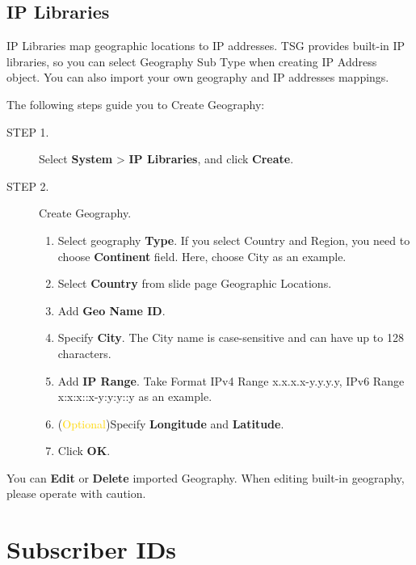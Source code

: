 \subsection*{\hypertarget{link:IP Libraries}{IP Libraries}}
\label{sec:objects:ip:library}

IP Libraries map geographic locations to IP addresses. TSG provides built-in IP libraries, so you can select Geography Sub Type when creating IP Address object. You can also import your own geography and IP addresses mappings. 


The following steps guide you to Create Geography:

\begin{description}
    \item[STEP 1.]	Select \textbf{System} > \textbf{IP Libraries}, and click \textbf{Create}.
    \item[STEP 2.]	Create Geography. 
    \begin{enumerate} 
        \item Select geography \textbf{Type}. If you select Country and Region, you need to choose \textbf{Continent} field. Here, choose City as an example.
        \item Select \textbf{Country} from slide page Geographic Locations.
        \item Add \textbf{Geo Name ID}.
        \item Specify \textbf{City}. The City name is case-sensitive and can have up to 128 characters.
        \item Add \textbf{IP Range}. Take Format IPv4 Range x.x.x.x-y.y.y.y, IPv6 Range x:x:x::x-y:y:y::y as an example.
        \item (\textcolor{gold}{Optional})Specify \textbf{Longitude} and \textbf{Latitude}. 
        \item Click \textbf{OK}.
    \end{enumerate}  
\end{description}

You can \textbf{Edit} or \textbf{Delete} imported Geography. When editing built-in geography, please operate with caution. 

\section*{\hypertarget{link:Subscriber IDs}{Subscriber IDs}}
\label{sec:objects:subscriber}

